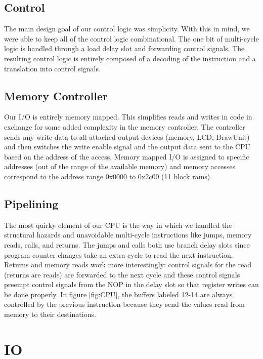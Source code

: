 \documentclass[onecolumn]{IEEEtran}
\begin{document}
\subsection{Control}
The main design goal of our control logic was simplicity.  With this in mind, we were able to keep all of the control logic combinational.  The one bit of multi-cycle logic is handled through a load delay slot and forwarding control signals.  The resulting control logic is entirely composed of a decoding of the instruction and a translation into control signals.

\subsection{Memory Controller}
Our I/O is entirely memory mapped.  This simplifies reads and writes in code in exchange for some added complexity in the memory controller.  The controller sends any write data to all attached output devices (memory, LCD, DrawUnit) and then switches the write enable signal and the output data sent to the CPU based on the address of the access.  Memory mapped I/O is assigned to specific addresses (out of the range of the available memory) and memory accesses correspond to the address range 0x0000 to 0x2c00 (11 block rams).

\subsection{Pipelining}
The most quirky element of our CPU is the way in which we handled the structural hazards and unavoidable multi-cycle instructions like jumps, memory reads, calls, and returns.  The jumps and calls both use branch delay slots since program counter changes take an extra cycle to read the next instruction.  Returns and memory reads work more interestingly: control signals for the read (returns are reads) are forwarded to the next cycle and these control signals preempt control signals from the NOP in the delay slot so that register writes can be done properly. In figure \ref{fig:CPU}, the buffers labeled 12-14 are always controlled by the previous instruction because they send the values read from memory to their destinations.

\section{IO}
\end{document}
